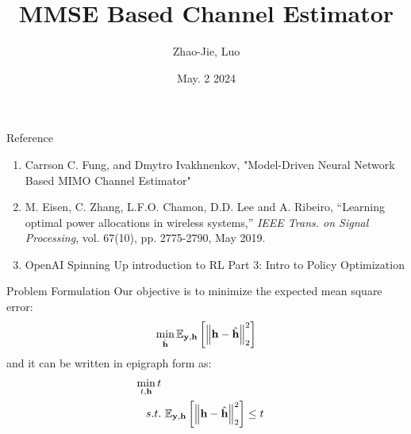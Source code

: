 \documentclass[hyperref={bookmarks=false}]{beamer}
\title{MMSE Based Channel Estimator}
\author{Zhao-Jie, Luo}
\institute[NYCU] %
{
\textit{janny00kevin@gmail.com} %
\\
\medskip
Advisor: Professor Carrson C. Fung\\ 
\medskip
National Yang Ming Chiao Tung University \\ %
}
\date{May. 2 2024}
\numberwithin{figure}{section}
\begin{document}
\frame{\titlepage}

\begin{frame}{Reference}
\begin{enumerate}
    \item Carrson C. Fung, and Dmytro Ivakhnenkov, "Model-Driven Neural Network Based MIMO Channel Estimator"
    \item M. Eisen, C. Zhang, L.F.O. Chamon, D.D. Lee and A. Ribeiro, ``Learning optimal power allocations in wireless systems,'' \emph{IEEE Trans. on Signal Processing}, vol. 67(10), pp. 2775-2790, May 2019.
    \item OpenAI Spinning Up introduction to RL Part 3: Intro to Policy Optimization %
\end{enumerate}

\end{frame}


\begin{frame}{Problem Formulation}
Our objective is to minimize the expected mean square error:
\begin{align*}
    \min_{\hat{{\bf h}}} \mathbb{E}_{{\bf y},{\bf h}}\left[\left\| {\bf h}-\hat{{\bf h}} \right\|^2_2 \right]\\
\end{align*}
and it can be written in epigraph form as:
\begin{align*}
    \min_{t,{\bf h}} {t}\\
    s.t. &\ \mathbb{E}_{{\bf y},{\bf h}}\left[\left\| {\bf h}-\hat{{\bf h}} \right\|^2_2 \right] \leq t\\
\end{align*}

\end{frame}
\end{document}
